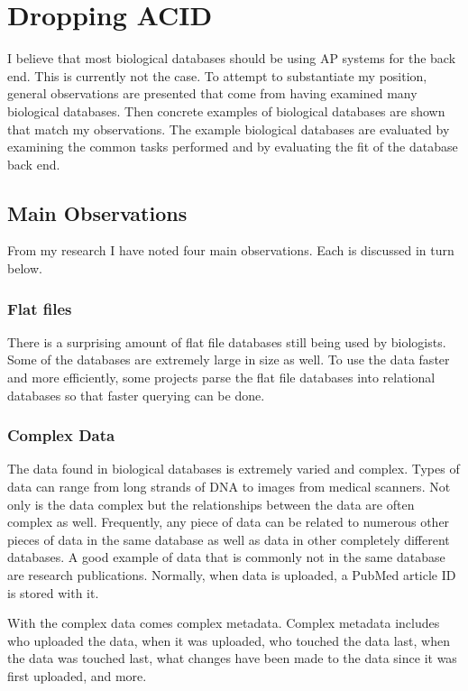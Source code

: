 \documentclass[12pt]{ucthesis}
\begin{document}
\chapter{Dropping ACID}
\label{dropping_acid}
I believe that most biological databases should be using AP systems for the back end. This is currently not the case. To attempt to substantiate my position, general observations are presented that come from having examined many biological databases. Then concrete examples of biological databases are shown that match my observations. The example biological databases are evaluated by examining the common tasks performed and by
evaluating the fit of the database back end.

\section{Main Observations}

From my research I have noted four main observations. Each is discussed in turn below.

\subsection{Flat files}
There is a surprising amount of flat file databases still being used by biologists. Some of
the databases are extremely large in size as well. To use the data faster and more efficiently, 
some projects parse the flat file databases into relational databases so that faster querying
can be done.

\subsection{Complex Data}
The data found in biological databases is extremely varied and complex. Types of data can range
from long strands of DNA to images from medical scanners. Not only is the data complex but the relationships
between the data are often complex as well. Frequently, any piece of data can be related to numerous other pieces of data in the same database as well as data in other completely different databases. A good example of
data that is commonly not in the same database are research publications. Normally, when data is uploaded, a
PubMed article ID is stored with it.

With the complex data comes complex metadata. Complex metadata includes who uploaded the data, when it
was uploaded, who touched the data last, when the data was touched last, what changes have been made to the data since it was first uploaded, and more.
 
\end{document}
